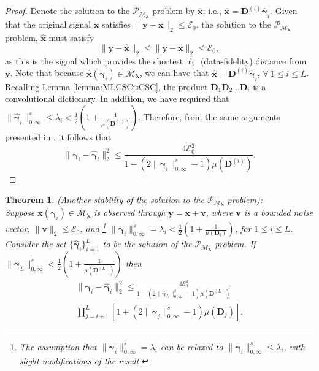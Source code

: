 \documentclass[10pt,journal]{IEEEtran}
\def\x{{\mathbf x}}
\def\v{{\mathbf v}}
\def\y{{\mathbf y}}
\def\D{{\mathbf D}}
\def\M{{\mathcal{M}}}
\def\P{{\mathcal{P}}}
\def\gama{{\boldsymbol \gamma}}
\def\lamda{{\boldsymbol \lambda}}
\def\PM{{\P_{\M_\lamda}}}
\theoremstyle{plain}
\newtheorem{thm}{Theorem} %
\theoremstyle{definition}
\begin{document}
\begin{proof}
	Denote the solution to the $\PM$ problem by $\hat{\x}$; i.e., $\hat{\x} = \D^{(i)}\hat{\gama}_i$.  Given that the original signal $\x$ satisfies $\|\y-\x\|_2\leq \mathcal{E}_0$,  the solution to the $\PM$ problem, $\hat{\x}$ must satisfy 
	\begin{equation}
	\|\y-\hat{\x}\|_2\leq \|\y- \x \|_2\leq \mathcal{E}_0,
	\end{equation}
	as this is the signal which provides the shortest $\ell_2$ (data-fidelity) distance from $\y$. Note that because $\hat{\x}(\gama_i)\in \M_{\lamda}$, we can have that $\hat{\x} = \D^{(i)}\hat{\gama}_i$, $\forall\ 1\leq i \leq L$. Recalling Lemma \ref{lemma:MLCSCisCSC}, the product $\D_1\D_2\dots\D_i$ is a convolutional dictionary. In addition, we have required that $\|\hat{\gama}_i\|^s_{0,\infty} \leq \lambda_i < \frac{1}{2}\left(1+\frac{1}{\mu(\D^{(i)})}\right) $. Therefore, from the same arguments presented in \cite{WorkingLocallyThinkingGlobally}, it follows that
	\begin{equation}
	\|\gama_i-\hat{\gama}_i\|_2^2\leq \frac{4\mathcal{E}_0^2}{1-(2\|\gama_i\|^s_{0,\infty}-1)\mu(\D^{(i)})}.
	\end{equation}
	
\end{proof}


\label{app:AnotherStabilityforPM}
\begin{thm}{(Another stability of the solution to the $\PM$ problem):}\\
	Suppose $\x(\gama_i) \in \M_\lamda$ is observed through $\y = \x+ \v$, where $\v$ is a bounded noise vector, $\|\v\|_2 \leq \mathcal{E}_0$, and \footnote{The assumption that $\|\gama_i\|^s_{0,\infty} = \lambda_i$ can be relaxed to $\|\gama_i\|^s_{0,\infty} \leq \lambda_i$, with slight modifications of the result.} $\|\gama_i\|^s_{0,\infty} = \lambda_i < \frac{1}{2}\left(1+\frac{1}{\mu(\D_i)}\right)$, for $1\leq i \leq L$. Consider the set $\{\hat{\gama}_i\}_{i=1}^{L}$ to be the solution of the $\PM$ problem. If $\| {\gama}_L \|^s_{0,\infty} < \frac{1}{2} \left( 1 + \frac{1}{\mu(\D^{(L)})}\right)$ then 
	\begin{multline} \label{Eq:DCPEStability}
	\| \gama_i- \hat{\gama}_i \|_2^2 \leq \frac{4\mathcal{E}_{0}^2}{1-(2\|\gama_{L}\|^s_{0,\infty}-1)\mu(\D^{(L)})} \\ \prod_{j=i+1}^{L} \left[1 + (2\|\gama_{j}\|^s_{0,\infty} -1)\mu(\D_{j}) \right].
	\end{multline}
\end{thm}
\end{document}
